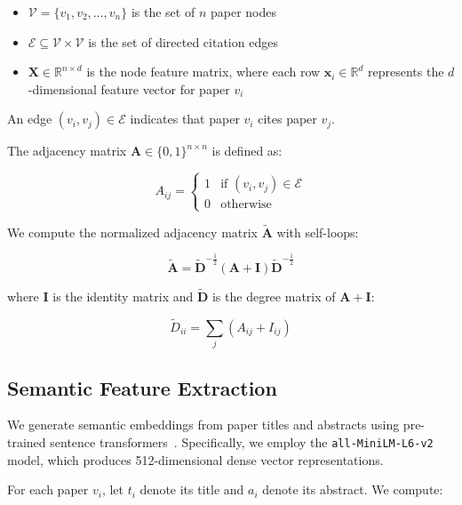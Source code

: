 \documentclass[pdflatex,sn-mathphys-num]{sn-jnl}
\theoremstyle{thmstyleone}%
\theoremstyle{thmstyletwo}%
\theoremstyle{thmstylethree}%
\begin{document}
\begin{itemize}
    \item $\mathcal{V} = \{v_1, v_2, \ldots, v_n\}$ is the set of $n$ paper nodes
    \item $\mathcal{E} \subseteq \mathcal{V} \times \mathcal{V}$ is the set of directed citation edges
    \item $\mathbf{X} \in \mathbb{R}^{n \times d}$ is the node feature matrix, where each row $\mathbf{x}_i \in \mathbb{R}^d$ represents the $d$-dimensional feature vector for paper $v_i$
\end{itemize}

An edge $(v_i, v_j) \in \mathcal{E}$ indicates that paper $v_i$ cites paper $v_j$.

The adjacency matrix $\mathbf{A} \in \{0,1\}^{n \times n}$ is defined as:

\begin{equation}
    A_{ij} = \begin{cases}
        1 & \text{if } (v_i, v_j) \in \mathcal{E} \\
        0 & \text{otherwise}
    \end{cases}
\end{equation}

We compute the normalized adjacency matrix $\tilde{\mathbf{A}}$ with self-loops:

\begin{equation}
    \tilde{\mathbf{A}} = \tilde{\mathbf{D}}^{-\frac{1}{2}} (\mathbf{A} + \mathbf{I}) \tilde{\mathbf{D}}^{-\frac{1}{2}}
\end{equation}

where $\mathbf{I}$ is the identity matrix and $\tilde{\mathbf{D}}$ is the degree matrix of $\mathbf{A} + \mathbf{I}$:

\begin{equation}
    \tilde{D}_{ii} = \sum_{j} (A_{ij} + I_{ij})
\end{equation}

\subsection{Semantic Feature Extraction}

We generate semantic embeddings from paper titles and abstracts using pre-trained sentence transformers~\cite{reimers2019sentence}. Specifically, we employ the \texttt{all-MiniLM-L6-v2} model, which produces 512-dimensional dense vector representations.

For each paper $v_i$, let $t_i$ denote its title and $a_i$ denote its abstract. We compute:
\end{document}
